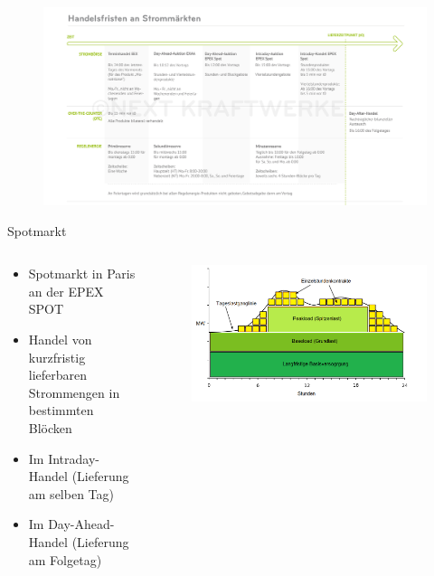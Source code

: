 \documentclass[aspectratio=1610, professionalfonts, 9pt]{beamer}
\begin{document}
{
\begin{frame}
  \begin{figure}
  \includegraphics[width=1.1\textwidth]{images/stromprodukte.jpg}
\end{figure}
\end{frame}
}

\begin{frame}{Spotmarkt}
  \begin{columns}
  \begin{column}{0.3\textwidth}
  \begin{itemize}
    \item Spotmarkt in Paris an der EPEX SPOT
    \item Handel von kurzfristig lieferbaren Strommengen in bestimmten Blöcken
    \item Im Intraday-Handel (Lieferung am selben Tag)
    \item Im Day-Ahead-Handel (Lieferung am Folgetag)
  \end{itemize}
  \end{column}
  \begin{column}{0.7\textwidth}
  \begin{figure}
  \includegraphics[width=1\textwidth]{images/Stromborse_stromverbrauch_lastprofil.png}
  \end{figure}
\end{column}
\end{columns}
\end{frame}
\end{document}
